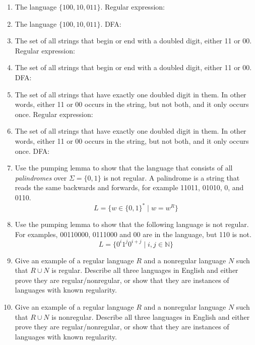 \documentclass{article}
\begin{document}
\begin{enumerate}
\item
  \label{langfirst}
  The language $\{100, 10, 011\}$.
  Regular expression: 

\item   The language $\{100, 10, 011\}$.
  DFA:
    

\item The set of 
  all strings that begin or end with a doubled digit, either 11 or 00.
  Regular expression:

  
\item The set of 
  all strings that begin or end with a doubled digit, either 11 or 00.
  DFA:

  
\item
The set of all strings that have exactly one doubled digit in them.
  In other words, either 11 or 00 occurs in the string, but not both,
  and it only occurs once.
  Regular expression:
  

\item \label{langlast}
The set of all strings that have exactly one doubled digit in them.
  In other words, either 11 or 00 occurs in the string, but not both,
  and it only occurs once.
DFA:

\item Use the pumping lemma to show that the language that consists of
  all {\em palindromes} over $\Sigma=\{0,1\}$ is not regular.  A palindrome
  is a string that reads the same backwards and forwards, for example
  11011, 01010, 0, and 0110.
  \[ L = \{w \in \{0,1\}^* \mid w = w^R\}\]

\item Use the pumping lemma to show that the following language is not
  regular.  For examples, 00110000, 0111000 and 00 are in the
  language, but 110 is not.
  \[ L = \{0^i1^j0^{i+j} \mid i,j\in\mathbb{N} \} \]
    


\item Give an example of a regular language $R$ and a nonregular
  language $N$ such that $R\cup N$ is regular.  Describe all three
  languages in English and either prove they are regular/nonregular,
  or show that they are instances of languages with known regularity.



\item Give an example of a regular language $R$ and a nonregular
  language $N$ such that $R\cup N$ is nonregular. Describe all three
  languages in English and either prove they are regular/nonregular,
  or show that they are instances of languages with known regularity.



\end{enumerate}
\end{document}
